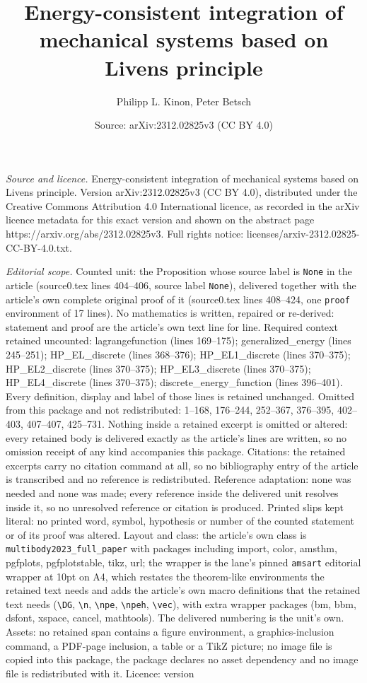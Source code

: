 \documentclass[10pt,a4paper]{amsart}
\title[Energy-consistent integration of mechanical systems based on]{Energy-consistent integration of mechanical systems based on Livens principle}
\author{Philipp L. Kinon, Peter Betsch}
\date{Source: arXiv:2312.02825v3 (CC BY 4.0)}
\begin{document}
\maketitle

\noindent\emph{Source and licence.} Energy-consistent integration of mechanical systems based on Livens principle. Version arXiv:2312.02825v3 (CC BY 4.0), distributed under the Creative Commons Attribution 4.0 International licence, as recorded in the arXiv licence metadata for this exact version and shown on the abstract page https://arxiv.org/abs/2312.02825v3. Full rights notice: licenses/arxiv-2312.02825-CC-BY-4.0.txt.\par\smallskip

\noindent\textit{Editorial scope.} Counted unit: the Proposition whose source label is \texttt{None} in the article (source0.tex lines 404--406, source label \texttt{None}), delivered together with the article's own complete original proof of it (source0.tex lines 408--424, one \texttt{proof} environment of 17 lines). No mathematics is written, repaired or re-derived: statement and proof are the article's own text line for line. Required context retained uncounted: lagrangefunction (lines 169--175); generalized\_energy (lines 245--251); HP\_EL\_discrete (lines 368--376); HP\_EL1\_discrete (lines 370--375); HP\_EL2\_discrete (lines 370--375); HP\_EL3\_discrete (lines 370--375); HP\_EL4\_discrete (lines 370--375); discrete\_energy\_function (lines 396--401). Every definition, display and label of those lines is retained unchanged. Omitted from this package and not redistributed: 1--168, 176--244, 252--367, 376--395, 402--403, 407--407, 425--731. Nothing inside a retained excerpt is omitted or altered: every retained body is delivered exactly as the article's lines are written, so no omission receipt of any kind accompanies this package. Citations: the retained excerpts carry no citation command at all, so no bibliography entry of the article is transcribed and no reference is redistributed. Reference adaptation: none was needed and none was made; every reference inside the delivered unit resolves inside it, so no unresolved reference or citation is produced. Printed slips kept literal: no printed word, symbol, hypothesis or number of the counted statement or of its proof was altered. Layout and class: the article's own class is \texttt{multibody2023\_full\_paper} with packages including import, color, amsthm, pgfplots, pgfplotstable, tikz, url; the wrapper is the lane's pinned \texttt{amsart} editorial wrapper at 10pt on A4, which restates the theorem-like environments the retained text needs and adds the article's own macro definitions that the retained text needs (\texttt{\textbackslash DG}, \texttt{\textbackslash n}, \texttt{\textbackslash npe}, \texttt{\textbackslash npeh}, \texttt{\textbackslash vec}), with extra wrapper packages (bm, bbm, dsfont, xspace, cancel, mathtools). The delivered numbering is the unit's own. Assets: no retained span contains a figure environment, a graphics-inclusion command, a PDF-page inclusion, a table or a TikZ picture; no image file is copied into this package, the package declares no asset dependency and no image file is redistributed with it. Licence: version 
\end{document}
